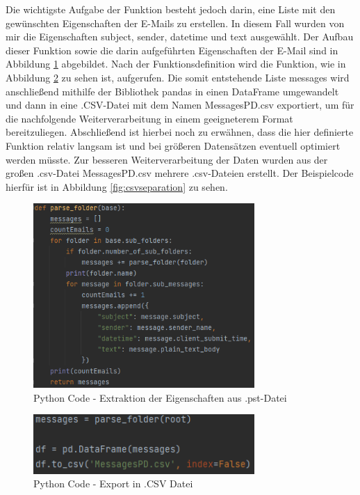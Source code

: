 \noindent Die wichtigste Aufgabe der Funktion besteht jedoch darin, eine Liste mit den gewünschten Eigenschaften der E-Mails zu erstellen. In diesem Fall wurden von mir die Eigenschaften \glqq{}subject\grqq{}, \glqq{}sender\grqq{}, \glqq{}datetime\grqq{} und \glqq{}text\grqq{} ausgewählt. Der Aufbau dieser Funktion sowie die darin aufgeführten Eigenschaften der E-Mail sind in Abbildung \ref{fig:extraction} abgebildet. Nach der Funktionsdefinition wird die Funktion, wie in Abbildung \ref{fig:dataframeparstetocsv} zu sehen ist, aufgerufen. Die somit entstehende Liste \glqq{}messages\grqq{} wird anschließend mithilfe der Bibliothek pandas in einen DataFrame umgewandelt und dann in eine .CSV-Datei mit dem Namen \glqq{}MessagesPD.csv\grqq{} exportiert, um für die nachfolgende Weiterverarbeitung in einem geeigneterem Format bereitzuliegen. Abschließend ist hierbei noch zu erwähnen, dass die hier definierte Funktion relativ langsam ist und bei größeren Datensätzen eventuell optimiert werden müsste. Zur besseren Weiterverarbeitung der Daten wurden aus der großen .csv-Datei \glqq{}MessagesPD.csv\grqq{} mehrere .csv-Dateien erstellt. Der Beispielcode hierfür ist in Abbildung \ref{fig:csvseparation} zu sehen.


\begin{figure}[!ht]
    \centering
    \includegraphics[width=0.75\textwidth]{images/Extraktion_aus_Pst_file.PNG}
    \caption{Python Code - Extraktion der Eigenschaften aus .pst-Datei} 
    \label{fig:extraction}
\end{figure}

\begin{figure}[!ht]
    \centering
    \includegraphics[width=0.75\textwidth]{images/Dataframe_messages.PNG}
    \caption{Python Code - Export in .CSV Datei} 
    \label{fig:dataframeparstetocsv}
\end{figure}

